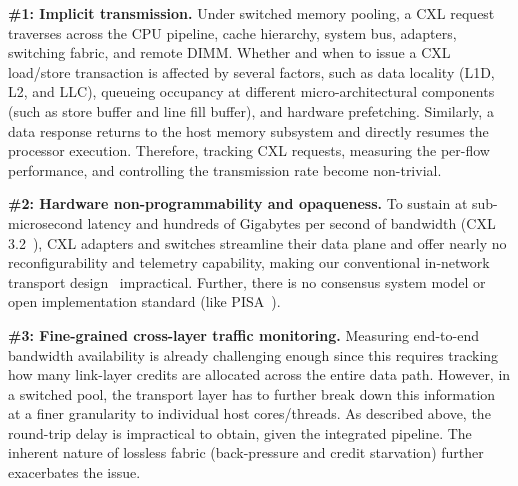 \squishlist

    \item {\bf \#1: Implicit transmission.} Under switched memory pooling, a CXL request traverses across the CPU pipeline, cache hierarchy, system bus, adapters, switching fabric, and remote DIMM. Whether and when to issue a CXL load/store transaction is affected by several factors, such as data locality (L1D, L2, and LLC), queueing occupancy at different micro-architectural components (such as store buffer and line fill buffer), and hardware prefetching. Similarly, a data response returns to the host memory subsystem and directly resumes the processor execution. Therefore, tracking CXL requests, measuring the per-flow performance, and controlling the transmission rate become non-trivial.
    
    \item {\bf \#2: Hardware non-programmability and opaqueness.} To sustain at sub-microsecond latency and hundreds of Gigabytes per second of bandwidth (CXL 3.2~\cite{cxl-spec}), CXL adapters and switches streamline their data plane and offer nearly no reconfigurability and telemetry capability, making our conventional in-network transport design~\cite{abm-sigcomm22, dcqcn-sigcomm15, hpcc-sigcomm19, aeolus-sigcomm20, harmony-nsdi24} impractical. Further, there is no consensus system model or open implementation standard (like PISA~\cite{rmt-sigcomm13}).

    \item {\bf \#3: Fine-grained cross-layer traffic monitoring.} Measuring end-to-end bandwidth availability is already challenging enough since this requires tracking how many link-layer credits are allocated across the entire data path. However, in a switched pool, the transport layer has to further break down this information at a finer granularity to individual host cores/threads. As described above, the round-trip delay is impractical to obtain, given the integrated pipeline. The inherent nature of lossless fabric (back-pressure and credit starvation) further exacerbates the issue.

\squishend





